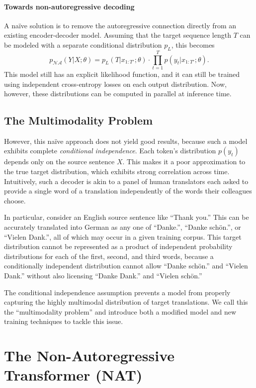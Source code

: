 \paragraph{Towards non-autoregressive decoding}
A na\"{i}ve solution is to remove the autoregressive connection directly from an existing encoder-decoder model. Assuming that the target sequence length $T$ can be modeled with a separate conditional distribution $p_L$, this becomes
\begin{equation}
p_{\mathcal{NA}}(Y|X; \theta) = p_L(T|x_{1:T'};\theta)\cdot \prod_{t=1}^T p(y_t| x_{1:T'};\theta).
\label{eq.simple}
\end{equation}
This model still has an explicit likelihood function, and it can still be trained using independent cross-entropy losses on each output distribution. Now, however, these distributions can be computed in parallel at inference time. 

\subsection{The Multimodality Problem}
However, this na\"{i}ve approach does not yield good results, because such a model exhibits complete \emph{conditional independence}.
Each token's distribution $p(y_t)$  depends only on the source sentence $X$. 
This makes it a poor approximation to the true target distribution, which exhibits strong correlation across time. 
Intuitively, such a decoder is akin to a panel of human translators each asked to provide a single word of a translation independently of the words their colleagues choose.

In particular, consider an English source sentence like ``Thank you.'' This can be accurately translated into German as any one of ``Danke.'', ``Danke sch\"{o}n.'', or ``Vielen Dank.'', all of which may occur in a given training corpus. This target distribution cannot be represented as a product of independent probability distributions for each of the first, second, and third words, because a conditionally independent distribution cannot allow ``Danke sch\"{o}n.'' and ``Vielen Dank.'' without also licensing ``Danke Dank.'' and ``Vielen sch\"{o}n.''

The conditional independence assumption prevents a model from properly capturing the highly multimodal distribution of target translations.
We call this the ``multimodality problem'' and introduce both a modified model and new training techniques to tackle this issue.

\section{The Non-Autoregressive Transformer (NAT)}
\label{cp8.sec.mainModelSection}

